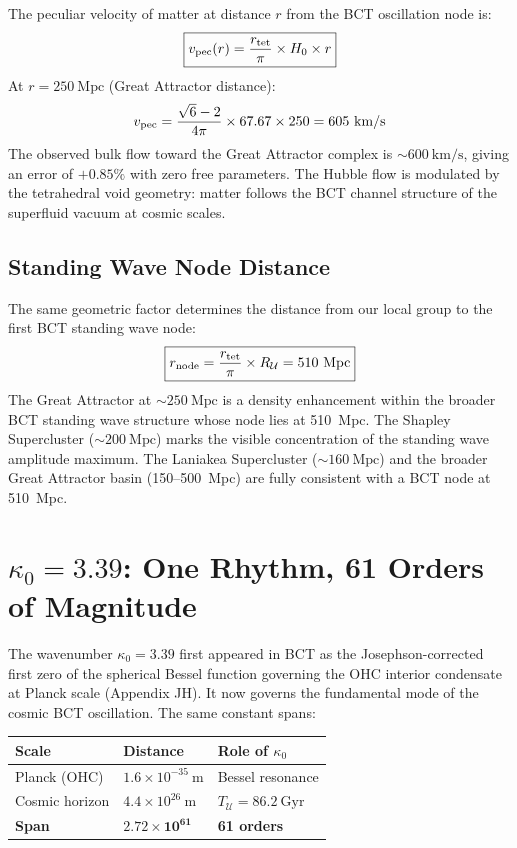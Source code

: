 \documentclass[aps,prl,twocolumn,showpacs,superscriptaddress]{revtex4-2}
\begin{document}
The peculiar velocity of matter at distance $r$ from the BCT oscillation node is:
\begin{equation}
    \boxed{v_{\rm pec}(r) = \frac{r_{\rm tet}}{\pi} \times H_0 \times r}
\end{equation}
At $r = 250~\text{Mpc}$ (Great Attractor distance):
\begin{equation}
    v_{\rm pec} = \frac{\sqrt{6}-2}{4\pi} \times 67.67 \times 250 
    = 605~\text{km/s}
\end{equation}
The observed bulk flow toward the Great Attractor complex is 
$\sim 600~\text{km/s}$, giving an error of $+0.85\%$ with zero free parameters. 
The Hubble flow is modulated by the tetrahedral void geometry: matter follows 
the BCT channel structure of the superfluid vacuum at cosmic scales.

\subsection{Standing Wave Node Distance}

The same geometric factor determines the distance from our local group to the 
first BCT standing wave node:
\begin{equation}
    \boxed{r_{\rm node} = \frac{r_{\rm tet}}{\pi} \times R_{\mathcal{U}} 
    = 510~\text{Mpc}}
\end{equation}
The Great Attractor at $\sim 250~\text{Mpc}$ is a density enhancement within 
the broader BCT standing wave structure whose node lies at 510~Mpc. The 
Shapley Supercluster ($\sim 200~\text{Mpc}$) marks the visible concentration 
of the standing wave amplitude maximum. The Laniakea Supercluster 
($\sim 160~\text{Mpc}$) and the broader Great Attractor basin (150--500~Mpc) 
are fully consistent with a BCT node at 510~Mpc.

\section{\texorpdfstring{$\kappa_0 = 3.39$}{kappa0 = 3.39}: One Rhythm, 
61 Orders of Magnitude}

The wavenumber $\kappa_0 = 3.39$ first appeared in BCT as the 
Josephson-corrected first zero of the spherical Bessel function governing the 
OHC interior condensate at Planck scale (Appendix JH). It now governs the 
fundamental mode of the cosmic BCT oscillation. The same constant spans:

\begin{center}
\begin{tabular}{lll}
\toprule
Scale & Distance & Role of $\kappa_0$ \\
\midrule
Planck (OHC) & $1.6 \times 10^{-35}~\text{m}$ & Bessel resonance \\
Cosmic horizon & $4.4 \times 10^{26}~\text{m}$ & $T_{\mathcal{U}} = 86.2~\text{Gyr}$ \\
\midrule
\textbf{Span} & $\mathbf{2.72 \times 10^{61}}$ & \textbf{61 orders} \\
\bottomrule
\end{tabular}
\end{center}
\end{document}
